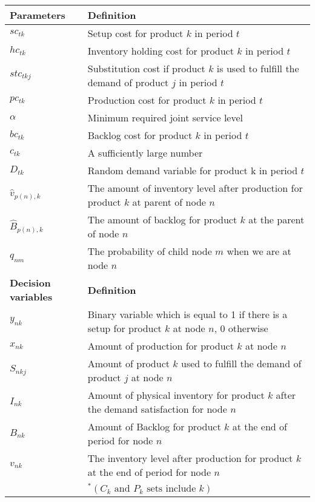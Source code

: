 \documentclass[10pt]{article}
\newcommand{\ti}{t} %
\newcommand{\ka}{k} %
\newcommand{\jey}{j} %
\newcommand{\Bi}{B} %
\newcommand{\Vi}{v} %
\newcommand{\Es}{S} %
\newcommand{\x}{x} %
\newcommand{\y}{y} %
\newcommand{\InvPos}{inventory level after production }
\begin{document}
\begin{table}[H]
\begin{adjustbox}{width=1\textwidth,center=\textwidth}
\begin{tabular}{ll}
{\textbf {Parameters}} & {\textbf {Definition}} \\ \midrule
$sc_{\ti \ka}$ & Setup cost for product $\ka$ in period $\ti$ \\ 
$hc_{\ti \ka}$  & Inventory holding cost for product $k$ in period $\ti$  \\ 
$stc_{\ti \ka \jey }$  & Substitution cost if product $\ka$  is used to fulfill the demand of product $j$ in period $\ti$  \\ 
$pc_{\ti \ka}$  & Production cost for product $k$ in period $\ti$  \\
$\alpha$  & Minimum required joint service level \\ 
$bc_{\ti \ka}$  & Backlog cost for product $\ka$  in period $\ti$ \\
$c_{\ti \ka}$  & A sufficiently large number \\ 
${D}_{\ti \ka}$ & Random demand variable for product {\ka } in period $\ti$  \\ 
$\hat{\Vi}_{p(n), \ka} $&  The amount of \InvPos for product $\ka$ at parent of node  $n$\\
$\hat{\Bi}_{p(n), \ka} $&  The amount of backlog for product $\ka$ at the parent of node $n$  \\
$q_{nm} $&  The probability of child node $m$ when we are at node $n$  \\
{\textbf {Decision variables}} & {\textbf {Definition}} \\ \midrule
$\y_{n \ka}$ & Binary variable which is equal to 1 if there is a setup for product $k$ at node $n$, 0 otherwise \\ 
$\x_{n \ka}$ & Amount of production for product $\ka$  at node $n$  \\ 
$\Es_{n \ka \jey}$ & Amount of product $\ka$  used to fulfill the demand of product $\jey$  at  node $n$   \\
${I}_{n \ka}$ & Amount of physical inventory for product $k$ after the demand satisfaction for node $n$  \\
${\Bi}_{n \ka}$ & Amount of Backlog for product $k$ at the end of period for node $n$  \\
${\Vi}_{n \ka}$ & The \InvPos for product $\ka$ at the end of period for node $n$  \\
 \bottomrule
 & $^*{ (C_k \text{ and } P_k  \text{ sets include } k) }$
\end{tabular}
\end{adjustbox}
 \label{tab:Sub_parameters}
\end{table}
\end{document}
